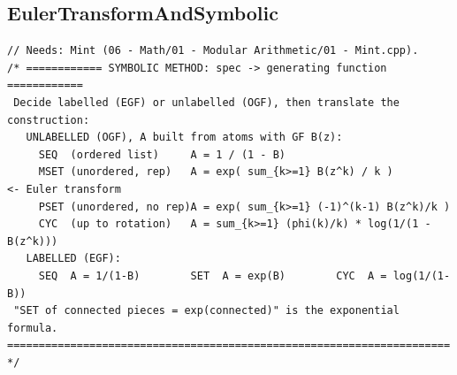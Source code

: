 \documentclass[9pt,a4paper,twocolumn]{extarticle}
\begin{document}
\subsection{EulerTransformAndSymbolic}
\nopagebreak
\begin{lstlisting}
// Needs: Mint (06 - Math/01 - Modular Arithmetic/01 - Mint.cpp).
/* ============ SYMBOLIC METHOD: spec -> generating function ============
 Decide labelled (EGF) or unlabelled (OGF), then translate the construction:
   UNLABELLED (OGF), A built from atoms with GF B(z):
     SEQ  (ordered list)     A = 1 / (1 - B)
     MSET (unordered, rep)   A = exp( sum_{k>=1} B(z^k) / k )          <- Euler transform
     PSET (unordered, no rep)A = exp( sum_{k>=1} (-1)^(k-1) B(z^k)/k )
     CYC  (up to rotation)   A = sum_{k>=1} (phi(k)/k) * log(1/(1 - B(z^k)))
   LABELLED (EGF):
     SEQ  A = 1/(1-B)        SET  A = exp(B)        CYC  A = log(1/(1-B))
 "SET of connected pieces = exp(connected)" is the exponential formula.
====================================================================== */


\end{lstlisting}
\end{document}
